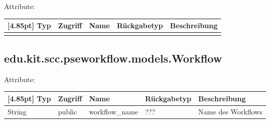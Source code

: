             Attribute:
            \begin{center}
            	\renewcommand{\arraystretch}{1.5}
	            \setlength\tabcolsep{5pt}
            	\begin{tabularx}{\textwidth}{|l|l|l|l|X|}
            		\hline
                    \rowcolor[gray]{0.75}[4.85pt]            		
            	    Typ & Zugriff & Name & Rückgabetyp & Beschreibung \\ \hline 
            	   	&&&&\\
            		\hline
            	\end{tabularx}
            \end{center}
%            
%        
        \subsection{edu.kit.scc.pseworkflow.models.Workflow}
            Attribute:
            \begin{center}
            	\renewcommand{\arraystretch}{1.5}
	            \setlength\tabcolsep{5pt}
            	\begin{tabularx}{\textwidth}{|l|l|l|l|X|}
            		\hline
                    \rowcolor[gray]{0.75}[4.85pt]            		
            	    Typ & Zugriff & Name & Rückgabetyp & Beschreibung \\ \hline
            		String & public & workflow\_name & ??? & Name des Workflows \\ \hline
            		
            	\end{tabularx}
            \end{center}
            
